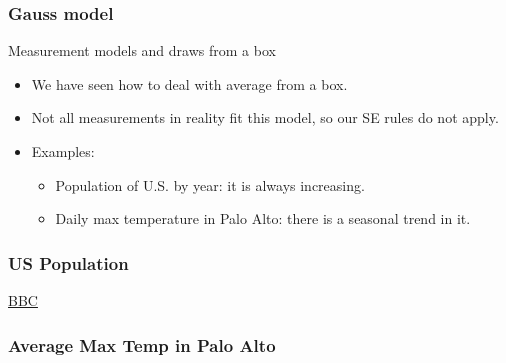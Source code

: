 \documentclass[handout]{beamer}
\begin{document}

   \begin{frame} \frametitle{Gauss model}

   \begin{block}
     {Measurement models and draws from a box}
     \begin{itemize}
     \item We have seen how to deal with average from a box.
     \item Not all measurements in reality fit this model, so our
      SE rules do not apply.
     \item Examples:
       \begin{itemize}
       \item Population of U.S. by year: it is always increasing.
       \item Daily max temperature in Palo Alto: there is a seasonal trend in it.
       \end{itemize}
     \end{itemize}
   \end{block}
   \end{frame}


   \begin{frame} \frametitle{US Population}

   \begin{figure}
   \centering
   \end{figure}

   \href{http://news.bbc.co.uk/2/hi/6057004.stm}{BBC}
   \end{frame}



   \begin{frame}
   \frametitle{Average Max Temp in Palo Alto}
   \begin{center}
   \end{center}

   \end{frame}

\end{document}
